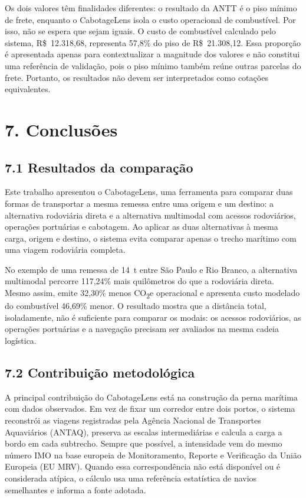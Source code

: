 \documentclass[brazil,]{article}
\let\oldsection\section
\renewcommand{\section}{\Needspace{14\baselineskip}\oldsection}
\let\oldsubsection\subsection
\renewcommand{\subsection}{\Needspace{12\baselineskip}\oldsubsection}
\begin{document}
Os dois valores têm finalidades diferentes: o resultado da ANTT é o piso
mínimo de frete, enquanto o CabotageLens isola o custo operacional de
combustível. Por isso, não se espera que sejam iguais. O custo de
combustível calculado pelo sistema, R\$~12.318,68, representa 57,8\% do piso de
R\$~21.308,12. Essa proporção é apresentada apenas para contextualizar a
magnitude dos valores e não constitui uma referência de validação, pois
o piso mínimo também reúne outras parcelas do frete. Portanto, os
resultados não devem ser interpretados como cotações equivalentes.

\clearpage
\hypertarget{conclusuxf5es}{%
\section{7. Conclusões}\label{conclusuxf5es}}

\hypertarget{resultados-da-comparauxe7uxe3o}{%
\subsection{7.1 Resultados da
comparação}\label{resultados-da-comparauxe7uxe3o}}

Este trabalho apresentou o CabotageLens, uma ferramenta para comparar
duas formas de transportar a mesma remessa entre uma origem e um
destino: a alternativa rodoviária direta e a alternativa multimodal com
acessos rodoviários, operações portuárias e cabotagem. Ao aplicar as
duas alternativas à mesma carga, origem e destino, o sistema evita
comparar apenas o trecho marítimo com uma viagem rodoviária completa.

No exemplo de uma remessa de 14~t entre São Paulo e Rio Branco, a
alternativa multimodal percorre 117,24\% mais quilômetros do que a
rodoviária direta. Mesmo assim, emite 32,30\% menos CO\textsubscript{2}e operacional e
apresenta custo modelado do combustível 46,69\% menor. O resultado
mostra que a distância total, isoladamente, não é suficiente para
comparar os modais: os acessos rodoviários, as operações portuárias e a
navegação precisam ser avaliados na mesma cadeia logística.

\hypertarget{contribuiuxe7uxe3o-metodoluxf3gica}{%
\subsection{7.2 Contribuição
metodológica}\label{contribuiuxe7uxe3o-metodoluxf3gica}}

A principal contribuição do CabotageLens está na construção da perna
marítima com dados observados. Em vez de fixar um corredor entre dois
portos, o sistema reconstrói as viagens registradas pela Agência
Nacional de Transportes Aquaviários (ANTAQ), preserva as escalas
intermediárias e calcula a carga a bordo em cada subtrecho. Sempre que
possível, a intensidade vem do mesmo número IMO na base europeia de
Monitoramento, Reporte e Verificação da União Europeia (EU MRV). Quando
essa correspondência não está disponível ou é considerada atípica, o
cálculo usa uma referência estatística de navios semelhantes e informa a
fonte adotada.
\end{document}
